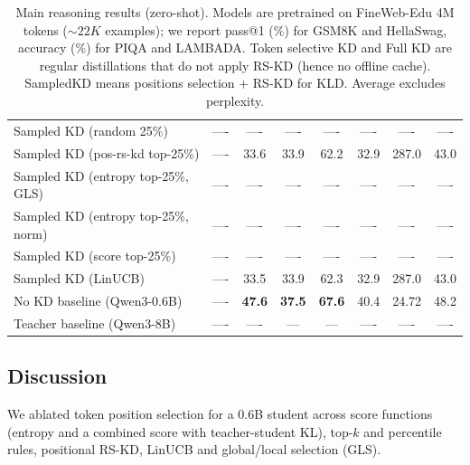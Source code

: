 \documentclass[11pt]{article}
\begin{document}
\begin{table}[t]
{\begin{tabular}{lccccccc}
		Sampled KD (random 25\%)         		   & ----    & ----                  & ----                      & ----                 & ----                        & ----                    & ----          \\
		Sampled KD (pos-rs-kd top-25\%)            & ----    & 33.6                  & 33.9                      & 62.2                 & 32.9                        & 287.0                   & 43.0          \\
		Sampled KD (entropy top-25\%, GLS) 		   & ----    & ----                  & ----                      & ----                 & ----                        & ----                    & ----          \\
		Sampled KD (entropy top-25\%, norm)		   & ----    & ----                  & ----                      & ----                 & ----                        & ----                    & ----          \\
		Sampled KD (score top-25\%)         	   & ----    & ----                  & ----                      & ----                 & ----                        & ----                    & ----          \\
		Sampled KD (LinUCB)			               & ----    & 33.5                  & 33.9                      & 62.3                 & 32.9                        & 287.0                   & 43.0          \\
		\midrule
		No KD baseline (Qwen3-0.6B)      		   & ---- & \textbf{47.6}         & \textbf{37.5}             & \textbf{67.6}        & 40.4                        & 24.72                   & 48.2          \\
		Teacher baseline (Qwen3-8B)      		   & ---- & ----                  & ---                       & ---                 	& ----                        & ----                    & ----          \\
		\bottomrule
	\end{tabular}
	} %
	\caption{Main reasoning results (zero-shot). Models are pretrained on FineWeb-Edu 4M tokens ($\sim 22K$ examples); we report pass@1 (\%) for GSM8K and HellaSwag, accuracy (\%) for PIQA and LAMBADA.
		Token selective KD and Full KD are regular distillations that do not apply RS-KD (hence no offline cache).
		SampledKD means positions selection + RS-KD for KLD.
		Average excludes perplexity.}
	\label{tab:main-reasoning}
\end{table}


\subsection{Discussion}
\label{sec:discussion}
We ablated token position selection for a 0.6B student across score functions (entropy and a combined score with teacher-student KL), top-$k$ and percentile rules, positional RS-KD, LinUCB and global/local selection (GLS).
\end{document}
